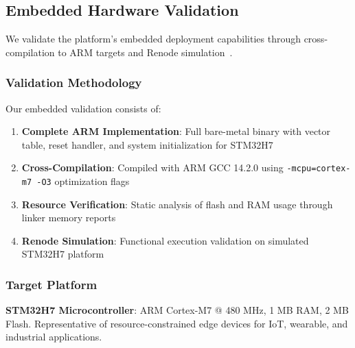 

\subsection{Embedded Hardware Validation}

We validate the platform's embedded deployment capabilities through
cross-compilation to ARM targets and Renode simulation~\cite{renode}.

\subsubsection{Validation Methodology}

Our embedded validation consists of:

\begin{enumerate}
\item \textbf{Complete ARM Implementation}: Full bare-metal binary with
vector table, reset handler, and system initialization for STM32H7

\item \textbf{Cross-Compilation}: Compiled with ARM GCC 14.2.0 using
\texttt{-mcpu=cortex-m7 -O3} optimization flags

\item \textbf{Resource Verification}: Static analysis of flash and RAM
usage through linker memory reports

\item \textbf{Renode Simulation}: Functional execution validation on
simulated STM32H7 platform
\end{enumerate}

\subsubsection{Target Platform}

\textbf{STM32H7 Microcontroller}: ARM Cortex-M7 @ 480 MHz, 1 MB RAM,
2 MB Flash. Representative of resource-constrained edge devices for
IoT, wearable, and industrial applications.


